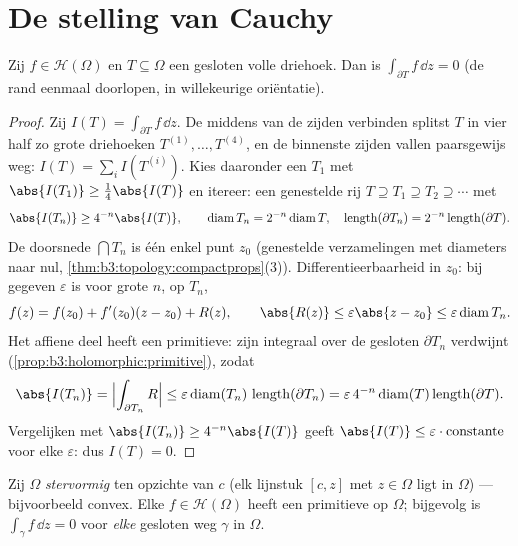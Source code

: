 \section{De stelling van Cauchy}

\begin{theorem}[Goursat]\label{thm:b3:holomorphic:goursat}
Zij $f \in \mathcal H(\Omega)$ en $T \subseteq \Omega$ een
gesloten volle driehoek. Dan is $\int_{\partial T}f\,\dd z = 0$
(de rand eenmaal doorlopen, in willekeurige
oriëntatie).
\end{theorem}

\begin{proof}
Zij $I(T) = \int_{\partial T}f\,\dd z$. De middens van de zijden
verbinden splitst $T$ in vier half zo grote driehoeken
$T^{(1)}, \dots, T^{(4)}$, en de binnenste zijden vallen
paarsgewijs weg: $I(T) = \sum_iI(T^{(i)})$. Kies daaronder een
$T_1$ met $\abs{I(T_1)} \geq \frac14\abs{I(T)}$ en itereer: een
genestelde rij $T \supseteq T_1 \supseteq T_2 \supseteq\cdots$
met
\[
\abs{I(T_n)} \geq 4^{-n}\abs{I(T)},
\qquad
\operatorname{diam}T_n = 2^{-n}\operatorname{diam}T,
\quad
\operatorname{length}(\partial T_n) =
2^{-n}\operatorname{length}(\partial T).
\]
De doorsnede $\bigcap T_n$ is één enkel punt $z_0$ (genestelde
 verzamelingen met diameters naar nul,
\cref{thm:b3:topology:compactprops}(3)). Differentieerbaarheid in
$z_0$: bij gegeven $\varepsilon$ is voor grote $n$, op $T_n$,
\[
f(z) = f(z_0) + f'(z_0)(z - z_0) + R(z),
\qquad \abs{R(z)} \leq \varepsilon\abs{z - z_0} \leq
\varepsilon\operatorname{diam}T_n .
\]
Het affiene deel heeft een primitieve: zijn integraal over de
gesloten $\partial T_n$ verdwijnt
(\cref{prop:b3:holomorphic:primitive}), zodat
\[
\abs{I(T_n)} = \Bigl|\int_{\partial T_n}R\Bigr|
\leq \varepsilon\operatorname{diam}(T_n)\,
\operatorname{length}(\partial T_n)
= \varepsilon\,4^{-n}\operatorname{diam}(T)
\operatorname{length}(\partial T) .
\]
Vergelijken met $\abs{I(T_n)} \geq 4^{-n}\abs{I(T)}$ geeft
$\abs{I(T)} \leq \varepsilon\cdot\text{constante}$ voor elke
$\varepsilon$: dus $I(T) = 0$.
\end{proof}

\begin{theorem}
\label{thm:b3:holomorphic:cauchy}
Zij $\Omega$ \emph{stervormig} ten opzichte van $c$ (elk lijnstuk
$[c, z]$ met $z \in \Omega$ ligt in $\Omega$) --- bijvoorbeeld
convex. Elke $f \in \mathcal H(\Omega)$ heeft een primitieve op
$\Omega$; bijgevolg is $\int_\gamma f\,\dd z = 0$ voor
\emph{elke} gesloten weg $\gamma$ in $\Omega$.
\end{theorem}

